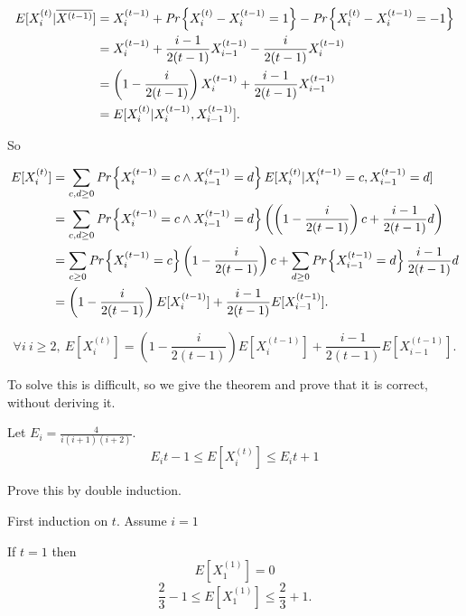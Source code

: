 \begin{align*}
E[X_i^{(t)} | \overline{X^{(t-1)}}] &= X_i^{(t-1)} + \emph{Pr}\left\{X_i^{(t)} -X_i^{(t-1)} = 1\right\} - \emph{Pr}\left\{X_i^{(t)} -X_i^{(t-1)} = -1\right\}\\
&= X_i^{(t-1)} + \frac{i-1}{2(t-1)}X_{i-1}^{(t-1)} -\frac{i}{2(t-1)}X_i^{(t-1)}\\
&=\left(1 -\frac{i}{2(t-1)}\right)X_i^{(t-1)} + \frac{i-1}{2(t-1)}X_{i-1}^{(t-1)}\\
&=E[X_i^{(t)} | X_i^{(t-1)}, X_{i-1}^{(t-1)}].
\end{align*}

So

\begin{align*}
E[X_i^{(t)}] &= \sum_{c,d \geq 0}\emph{Pr}\left\{X_i^{(t-1)} = c \wedge X_{i-1}^{(t-1)} = d\right\}E[X_i^{(t)} | X_i^{(t-1)} = c,  X_{i-1}^{(t-1)} = d]\\
&= \sum_{c,d \geq 0}\emph{Pr}\left\{X_i^{(t-1)} = c \wedge X_{i-1}^{(t-1)} = d\right\}\left(\left(1-\frac{i}{2(t-1)}\right)c + \frac{i -1}{2(t-1)}d\right)\\
& = \sum_{c \geq 0}\emph{Pr}\left\{X_i^{(t-1)} = c\right\}\left(1-\frac{i}{2(t-1)}\right)c + \sum_{d \geq 0}\emph{Pr}\left\{X_{i-1}^{(t-1)} = d\right\}\frac{i -1}{2(t-1)}d\\
&=\left(1-\frac{i}{2(t-1)}\right)E[X_i^{(t-1)}] +\frac{i -1}{2(t-1)}E[X_{i-1}^{(t-1)}] .
\end{align*}

\begin{lem}\label{pa_lem2}
	\begin{equation}
	\forall i\ i \geq 2,\ E[X_i^{(t)}] = \left(1-\frac{i}{2(t-1)}\right)E[X_i^{(t-1)}] +\frac{i -1}{2(t-1)}E[X_{i-1}^{(t-1)}].
	\end{equation}
\end{lem}

To solve this is difficult, so we give the theorem and prove that it is correct, without deriving it.

\begin{thm}\label{pa_thm}
	Let $E_i = \frac{4}{i(i+1)(i+2)}$. 
	\begin{equation}\label{pa_eq}
		E_it - 1 \leq E[X_i^{(t)}] \leq E_it + 1
	\end{equation}
\end{thm}

Prove this by double induction.

First induction on $t$. Assume $i = 1$

If $t = 1$ then
\begin{equation}
	E[X_1^{(1)}] = 0
\end{equation}
\begin{equation}
	\frac{2}{3} - 1 \leq E[X_1^{(1)}] \leq \frac{2}{3} + 1.
\end{equation}


